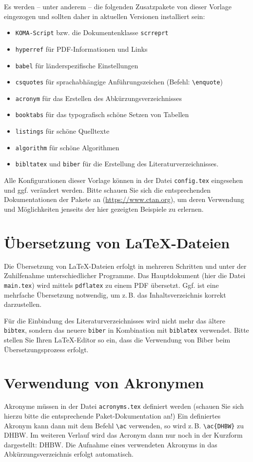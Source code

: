 Es werden -- unter anderem -- die folgenden Zusatzpakete von dieser Vorlage eingezogen und sollten daher in aktuellen Versionen installiert sein:
\begin{itemize}
	\item\texttt{KOMA-Script} bzw. die Dokumentenklasse \texttt{scrreprt}
	\item\texttt{hyperref} für PDF-Informationen und Links
	\item \texttt{babel} für länderspezifische Einstellungen
	\item \texttt{csquotes} für sprachabhängige Anführungszeichen (Befehl: \texttt{\textbackslash enquote})
	\item \texttt{acronym} für das Erstellen des Abkürzungsverzeichnisses
	\item \texttt{booktabs} für das typografisch schöne Setzen von Tabellen
	\item \texttt{listings} für schöne Quelltexte
	\item \texttt{algorithm} für schöne Algorithmen
	\item \texttt{bibltatex} und \texttt{biber} für die Erstellung des Literaturverzeichnisses.
\end{itemize}
Alle Konfigurationen dieser Vorlage können in der Datei \texttt{config.tex} eingesehen und ggf. verändert werden. Bitte schauen Sie sich die entsprechenden Dokumentationen
der Pakete an (\url{https://www.ctan.org}), um deren Verwendung und Möglichkeiten jenseits der hier gezeigten Beispiele zu erlernen.


\section{Übersetzung von \LaTeX-Dateien}
Die Übersetzung von \LaTeX-Dateien erfolgt in mehreren Schritten und unter der Zuhilfenahme unterschiedlicher Programme. Das Hauptdokument (hier die Datei \texttt{main.tex}) wird mittels \texttt{pdflatex} zu einem PDF übersetzt. Ggf. ist eine mehrfache Übersetzung notwendig, um z.\,B. das Inhaltsverzeichnis korrekt darzustellen.

Für die Einbindung des Literaturverzeichnisses wird nicht mehr das ältere \texttt{bibtex}, sondern das neuere \texttt{biber} in Kombination mit \texttt{biblatex} verwendet. Bitte stellen Sie Ihren \LaTeX-Editor so ein, dass die Verwendung von Biber beim Übersetzungsprozess erfolgt.

\section{Verwendung von Akronymen}
Akronyme müssen in der Datei \texttt{acronyms.tex} definiert werden (schauen Sie sich hierzu bitte die entsprechende Paket-Dokumentation an!) Ein definiertes Akronym kann dann mit dem Befehl \texttt{\textbackslash ac} verwenden, so wird z.\,B. \texttt{\textbackslash ac\{DHBW\}} zu \ac{DHBW}. Im weiteren Verlauf wird das Acronym dann nur noch in der Kurzform dargestellt: \ac{DHBW}. Die Aufnahme eines verwendeten Akronyms in das Abkürzungsverzeichnis erfolgt automatisch.

